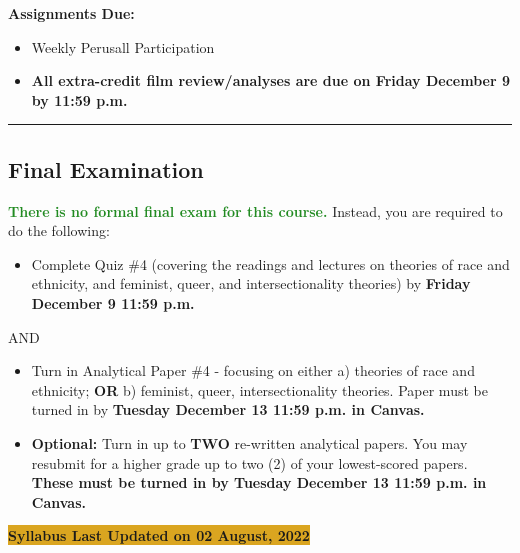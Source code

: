 \documentclass[11pt,]{article}
\providecommand{\tightlist}{%
  \setlength{\itemsep}{0pt}\setlength{\parskip}{0pt}}
\begin{document}
\textbf{Assignments Due:}

\begin{itemize}
\tightlist
\item
  Weekly Perusall Participation
\item
  \textbf{All extra-credit film review/analyses are due on Friday
  December 9 by 11:59 p.m.}
\end{itemize}

\bigbreak
\hrule

\hypertarget{final-examination}{%
\subsection{Final Examination}\label{final-examination}}

\textcolor{ForestGreen}{\bf{There is no formal final exam for this course.}}
Instead, you are required to do the following:

\begin{itemize}
\tightlist
\item
  Complete Quiz \#4 (covering the readings and lectures on theories of
  race and ethnicity, and feminist, queer, and intersectionality
  theories) by \textbf{Friday December 9 11:59 p.m.}
\end{itemize}

AND

\begin{itemize}
\item
  Turn in Analytical Paper \#4 - focusing on either a) theories of race
  and ethnicity; \textbf{OR} b) feminist, queer, intersectionality
  theories. Paper must be turned in by \textbf{Tuesday December 13 11:59
  p.m. in Canvas.}
\item
  \textcolor{BrickRed}{\bf{Optional:}} Turn in up to \textbf{TWO}
  re-written analytical papers. You may resubmit for a higher grade up
  to two (2) of your lowest-scored papers. \textbf{These must be turned
  in by Tuesday December 13 11:59 p.m. in Canvas.}
\end{itemize}

\textbf{\colorbox{Goldenrod}{Syllabus Last Updated on 02 August, 2022}}
\end{document}
